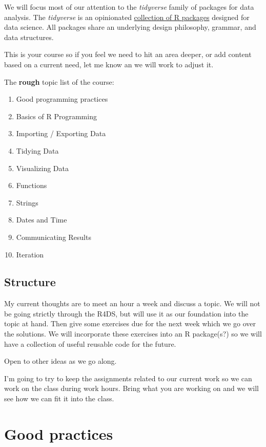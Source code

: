\documentclass[]{book}
\providecommand{\tightlist}{%
  \setlength{\itemsep}{0pt}\setlength{\parskip}{0pt}}
\theoremstyle{definition}
\theoremstyle{definition}
\theoremstyle{definition}
\theoremstyle{remark}
\begin{document}
We will focus most of our attention to the \emph{tidyverse} family of
packages for data analysis. The \emph{tidyverse} is an opinionated
\href{https://www.tidyverse.org/packages/}{collection of R packages}
designed for data science. All packages share an underlying design
philosophy, grammar, and data structures.

This is your course so if you feel we need to hit an area deeper, or add
content based on a current need, let me know an we will work to adjust
it.

The \textbf{rough} topic list of the course:

\begin{enumerate}
\def\labelenumi{\arabic{enumi}.}
\tightlist
\item
  Good programming practices
\item
  Basics of R Programming
\item
  Importing / Exporting Data
\item
  Tidying Data
\item
  Visualizing Data
\item
  Functions
\item
  Strings
\item
  Dates and Time
\item
  Communicating Results
\item
  Iteration
\end{enumerate}

\hypertarget{structure}{%
\section{Structure}\label{structure}}

My current thoughts are to meet an hour a week and discuss a topic. We
will not be going strictly through the R4DS, but will use it as our
foundation into the topic at hand. Then give some exercises due for the
next week which we go over the solutions. We will incorporate these
exercises into an R package(s?) so we will have a collection of useful
reusable code for the future.

Open to other ideas as we go along.

I'm going to try to keep the assignments related to our current work so
we can work on the class during work hours. Bring what you are working
on and we will see how we can fit it into the class.

\hypertarget{good-practices}{%
\chapter{Good practices}\label{good-practices}}
\end{document}
